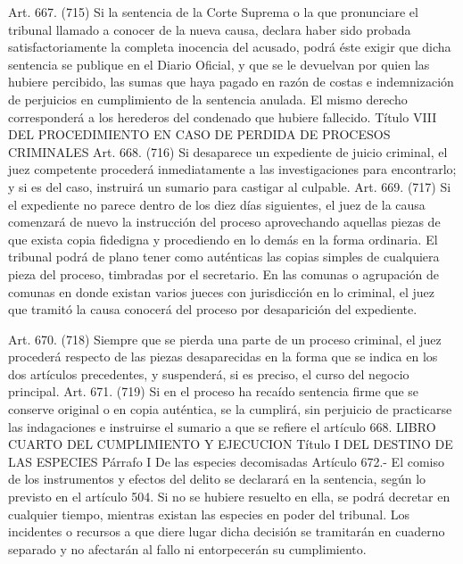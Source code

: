     Art. 667. (715) Si la sentencia de la Corte Suprema o la que pronunciare el tribunal llamado a conocer de la nueva causa, declara haber sido probada satisfactoriamente la completa inocencia del acusado, podrá éste exigir que dicha sentencia se publique en el Diario Oficial, y que se le devuelvan por quien las hubiere percibido, las sumas que haya pagado en razón de costas e indemnización de perjuicios en cumplimiento de la sentencia anulada.
    El mismo derecho corresponderá a los herederos del condenado que hubiere fallecido.
    Título VIII
    DEL PROCEDIMIENTO EN CASO DE PERDIDA DE PROCESOS
CRIMINALES
    Art. 668. (716) Si desaparece un expediente de juicio criminal, el juez competente procederá inmediatamente a las investigaciones para encontrarlo; y si es del caso, instruirá un sumario para castigar al culpable.
    Art. 669. (717) Si el expediente no parece dentro de los diez días siguientes, el juez de la causa comenzará de nuevo la instrucción del proceso aprovechando aquellas piezas de que exista copia fidedigna y procediendo en lo demás en la forma ordinaria.
    El tribunal podrá de plano tener como auténticas las copias simples de cualquiera pieza del proceso, timbradas por el secretario.
    En las comunas o agrupación de comunas en donde existan varios jueces con jurisdicción en lo criminal, el juez que tramitó la causa conocerá del proceso por desaparición del expediente.


    Art. 670. (718) Siempre que se pierda una parte de un proceso criminal, el juez procederá respecto de las piezas desaparecidas en la forma que se indica en los dos artículos precedentes, y suspenderá, si es preciso, el curso del negocio principal.
    Art. 671. (719) Si en el proceso ha recaído sentencia firme que se conserve original o en copia auténtica, se la cumplirá, sin perjuicio de practicarse las indagaciones e instruirse el sumario a que se refiere el artículo 668.
  LIBRO CUARTO
  DEL CUMPLIMIENTO Y EJECUCION
  Título I 
  DEL DESTINO DE LAS ESPECIES
  Párrafo I
  De las especies decomisadas
    Artículo 672.- El comiso de los instrumentos y efectos del delito se declarará en la sentencia, según lo previsto en el artículo 504. Si no se hubiere resuelto en ella, se podrá decretar en cualquier tiempo, mientras existan las especies en poder del tribunal. Los incidentes o recursos a que diere lugar dicha decisión se tramitarán en cuaderno separado y no afectarán al fallo ni entorpecerán su cumplimiento.


